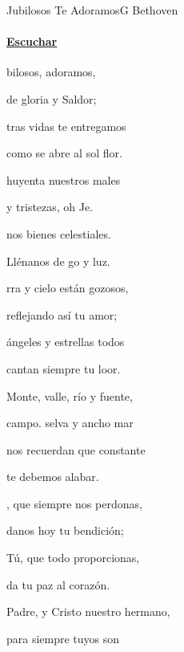 \documentclass[12pt, spanish]{book}
\begin{document}
    \begin{song}{Jubilosos Te Adoramos}{G}
    {} %
    {Bethoven}
    {} %
    {}
        \ifChordBk
        \paragraph{\mbox{}\hfill\protect\href{https://open.spotify.com/intl-es/track/2G8rT8LJJdx8tuTxPBDJIE}{Escuchar}\mbox{}\hfill}
        \fi

        \begin{SBOpGroup}
            bilosos,  adoramos,

             de gloria y Saldor;

            tras vidas te entregamos

            como se abre al sol  flor.

            huyenta nuestros males

            y tristezas, oh Je.

            nos bienes celestiales.

            Llénanos de go y luz.
        \end{SBOpGroup}

        \begin{SBOpGroup}
            rra y cielo están gozosos,

            reflejando así tu amor;

            ángeles y estrellas todos

            cantan siempre tu loor.

            Monte, valle, río y fuente,

            campo. selva y ancho mar

            nos recuerdan que constante

            te debemos alabar.
        \end{SBOpGroup}

        \begin{SBOpGroup}
            , que siempre nos perdonas,

            danos hoy tu bendición;

            Tú, que todo proporcionas,

            da tu paz al corazón.

            Padre, y Cristo nuestro hermano,

            para siempre tuyos son


\end{SBOpGroup}
\end{song}
\end{document}
